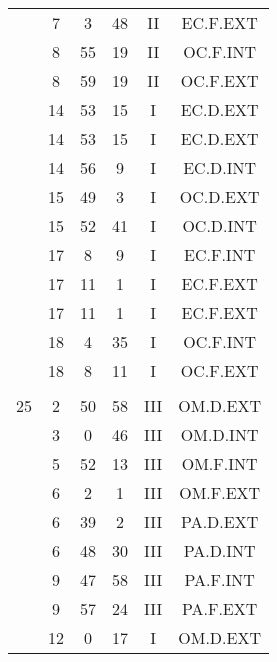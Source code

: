 \documentclass[12pt, a4paper]{article}
\begin{document}
\begin{multicols}{3}
{\begin{tabular}{c c c c c c}
	 	 	 	 & 7 & 3 & 48 & II & EC.F.EXT\\%
	 	 	 	 & 8 & 55 & 19 & II & OC.F.INT\\%
	 	 	 	 & 8 & 59 & 19 & II & OC.F.EXT\\%
	 	 	 	 & 14 & 53 & 15 & I & EC.D.EXT\\%
	 	 	 	 & 14 & 53 & 15 & I & EC.D.EXT\\%
	 	 	 	 & 14 & 56 & 9 & I & EC.D.INT\\%
	 	 	 	 & 15 & 49 & 3 & I & OC.D.EXT\\%
	 	 	 	 & 15 & 52 & 41 & I & OC.D.INT\\%
	 	 	 	 & 17 & 8 & 9 & I & EC.F.INT\\%
	 	 	 	 & 17 & 11 & 1 & I & EC.F.EXT\\%
	 	 	 	 & 17 & 11 & 1 & I & EC.F.EXT\\%
	 	 	 	 & 18 & 4 & 35 & I & OC.F.INT\\%
	 	 	 	 & 18 & 8 & 11 & I & OC.F.EXT\\%
	 	 	 	 & & & & & \\%
	 	 	 	25 & 2 & 50 & 58 & III & OM.D.EXT\\%
	 	 	 	 & 3 & 0 & 46 & III & OM.D.INT\\%
	 	 	 	 & 5 & 52 & 13 & III & OM.F.INT\\%
	 	 	 	 & 6 & 2 & 1 & III & OM.F.EXT\\%
	 	 	 	 & 6 & 39 & 2 & III & PA.D.EXT\\%
	 	 	 	 & 6 & 48 & 30 & III & PA.D.INT\\%
	 	 	 	 & 9 & 47 & 58 & III & PA.F.INT\\%
	 	 	 	 & 9 & 57 & 24 & III & PA.F.EXT\\%
	 	 	 	 & 12 & 0 & 17 & I & OM.D.EXT\\%

\end{tabular}}
\end{multicols}
\end{document}
